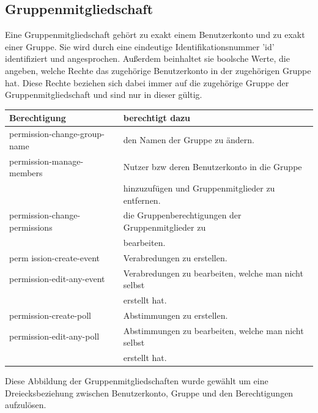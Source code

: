 \documentclass[parskip=full,11pt]{scrartcl}
\begin{document}
\pagebreak

\subsection{Gruppenmitgliedschaft}
Eine Gruppenmitgliedschaft gehört zu exakt einem Benutzerkonto und zu exakt
einer Gruppe. Sie wird durch eine eindeutige Identifikationsnummer 'id'
identifiziert und angesprochen. Außerdem beinhaltet sie boolsche Werte,
die angeben, welche Rechte das zugehörige Benutzerkonto in der zugehörigen
Gruppe hat. Diese Rechte beziehen sich dabei immer auf die zugehörige Gruppe
der Gruppenmitgliedschaft und sind nur in dieser gültig.\\
\begin{tabular}[t]{ l l }
    \textbf{Berechtigung} & \textbf{berechtigt dazu}\\
    \hline
    permission-change-group-name & den Namen der Gruppe zu ändern.\\
    permission-manage-members & Nutzer bzw deren Benutzerkonto in die Gruppe\\
     & hinzuzufügen und Gruppenmitglieder zu entfernen.\\
    permission-change-permissions & die Gruppenberechtigungen der
        Gruppenmitglieder zu\\
     & bearbeiten.\\
    perm ission-create-event & Verabredungen zu erstellen.\\
    permission-edit-any-event & Verabredungen zu bearbeiten, welche man nicht
        selbst\\
     & erstellt hat.\\
    permission-create-poll & Abstimmungen zu erstellen.\\
    permission-edit-any-poll & Abstimmungen zu bearbeiten, welche man nicht
    selbst\\
     & erstellt hat.\\
\end{tabular}

Diese Abbildung der Gruppenmitgliedschaften wurde gewählt um eine
Dreiecksbeziehung zwischen Benutzerkonto,
Gruppe und den Berechtigungen aufzulösen.

\pagebreak
\end{document}

